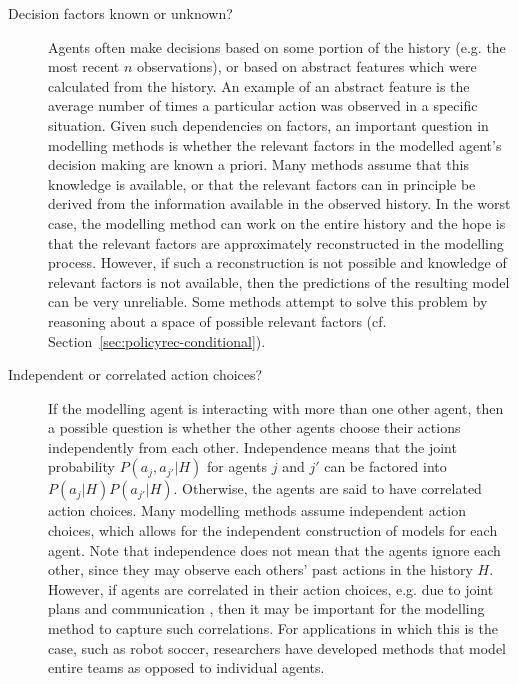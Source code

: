 \documentclass[final,1p,times,authoryear]{elsarticle}
\begin{document}
\begin{description}
	\item[Decision factors known or unknown?]  Agents often make decisions based on some portion of the history (e.g. the most recent $n$ observations), or based on abstract features which were calculated from the history. An example of an abstract feature is the average number of times a particular action was observed in a specific situation. Given such dependencies on factors, an important question in modelling methods is whether the relevant factors in the modelled agent's decision making are known a priori. Many methods assume that this knowledge is available, or that the relevant factors can in principle be derived from the information available in the observed history. In the worst case, the modelling method can work on the entire history and the hope is that the relevant factors are approximately reconstructed in the modelling process. However, if such a reconstruction is not possible and knowledge of relevant factors is not available, then the predictions of the resulting model can be very unreliable. Some methods attempt to solve this problem by reasoning about a space of possible relevant factors (cf. Section~\ref{sec:policyrec-conditional}).

	\item[Independent or correlated action choices?]  If the modelling agent is interacting with more than one other agent, then a possible question is whether the other agents choose their actions independently from each other. Independence means that the joint probability $P(a_j, a_{j'} | H)$ for agents $j$ and $j'$ can be factored into $P(a_j|H)P(a_{j'}|H)$. Otherwise, the agents are said to have correlated action choices. Many modelling methods assume independent action choices, which allows for the independent construction of models for each agent. Note that independence does not mean that the agents ignore each other, since they may observe each others' past actions in the history $H$. However, if agents are correlated in their action choices, e.g. due to joint plans and communication \citep{sv1999aij,gk1996}, then it may be important for the modelling method to capture such correlations. For applications in which this is the case, such as robot soccer, researchers have developed methods that model entire teams as opposed to individual agents.


\end{description}
\end{document}

